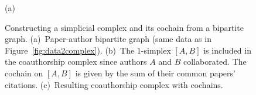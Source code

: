 \begin{figure}[htpb]
%
\settowidth{\tempwidth}{\usebox{\tempbox}}%
\hfil\begin{minipage}[b]{\tempwidth}%
\raisebox{-\height}{\usebox{\tempbox}}%
\scriptsize{\caption*{(a)}}%
\end{minipage}%
%
\settowidth{\tempwidth}{\usebox{\tempbox}}%
\hfil\begin{minipage}[b]{\tempwidth}%
\raisebox{-\height}{\usebox{\tempbox}}%
\scriptsize{}%
\end{minipage}%
\vspace{5pt}
\settowidth{\tempwidth}{\usebox{\tempbox}}%
\hfil\begin{minipage}[b]{\tempwidth}%
\raisebox{-\height}{\usebox{\tempbox}}%
\scriptsize{}%
\end{minipage}%
\caption{%
    Constructing a simplicial complex and its cochain from a bipartite graph.
    (a)~Paper-author bipartite graph (same data as in Figure~\ref{fig:data2complex}).
    (b)~The $1$-simplex $[A,B]$ is included in the coauthorship complex since authors $A$ and $B$ collaborated.
    The cochain on $[A,B]$ is given by the sum of their common papers' citations.
    (c)~Resulting coauthorship complex with cochains.
}\label{fig:bipartite}
\end{figure}

